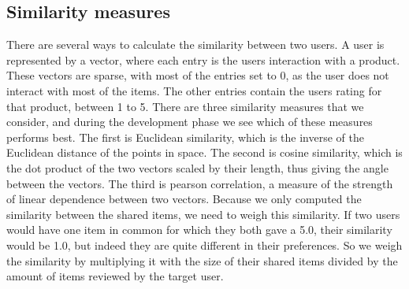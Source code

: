 \documentclass[11pt]{article}
\begin{document}
\subsection{Similarity measures}
There are several ways to calculate the similarity between two users. A user is represented by a vector, where each entry is the users interaction with a product. These vectors are sparse, with most of the entries set to 0, as the user does not interact with most of the items. The other entries contain the users rating for that product, between 1 to 5. There are three similarity measures that we consider, and during the development phase we see which of these measures performs best. The first is Euclidean similarity, which is the inverse of the Euclidean distance of the points in space. The second is cosine similarity, which is the dot product of the two vectors scaled by their length, thus giving the angle between the vectors. The third is pearson correlation, a measure of the strength of linear dependence between two vectors. Because we only computed the similarity between the shared items, we need to weigh this similarity. If two users would have one item in common for which they both gave a 5.0, their similarity would be 1.0, but indeed they are quite different in their preferences. So we weigh the similarity by multiplying it with the size of their shared items divided by the amount of items reviewed by the target user.
\end{document}
